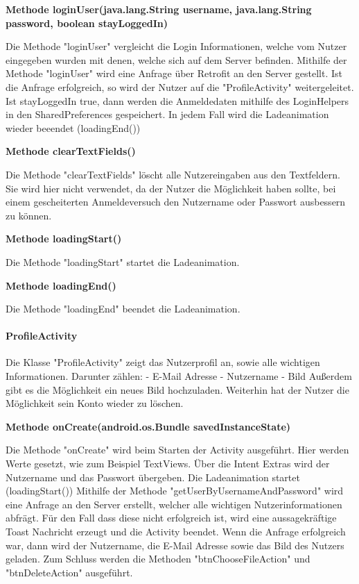 \documentclass{scrartcl}
\begin{document}
\noindent\textbf{Methode loginUser(java.lang.String username, \newline                     java.lang.String password, boolean stayLoggedIn)}

\noindent Die Methode "loginUser" vergleicht die Login Informationen, welche vom Nutzer eingegeben wurden mit denen, welche sich auf dem Server befinden. Mithilfe der Methode "loginUser" wird eine Anfrage über Retrofit an den Server gestellt. Ist die Anfrage erfolgreich, so wird der Nutzer auf die "ProfileActivity" weitergeleitet. Ist stayLoggedIn true, dann werden die Anmeldedaten mithilfe des LoginHelpers in den SharedPreferences gespeichert. In jedem Fall wird die Ladeanimation wieder beeendet (loadingEnd()) \newline

\noindent\textbf{Methode clearTextFields()}

\noindent Die Methode "clearTextFields" löscht alle Nutzereingaben aus den Textfeldern. Sie wird hier nicht verwendet, da der Nutzer die Möglichkeit haben sollte, bei einem gescheiterten Anmeldeversuch den Nutzername oder Passwort ausbessern zu können. \newline 

\noindent\textbf{Methode loadingStart()}

\noindent Die Methode "loadingStart" startet die Ladeanimation. \newline

\noindent\textbf{Methode loadingEnd()}

\noindent Die Methode "loadingEnd" beendet die Ladeanimation. \newline

\newpage

\paragraph{ProfileActivity}
Die Klasse "ProfileActivity" zeigt das Nutzerprofil an, sowie alle wichtigen Informationen. Darunter zählen: - E-Mail Adresse - Nutzername - Bild Außerdem gibt es die Möglichkeit ein neues Bild hochzuladen. Weiterhin hat der Nutzer die Möglichkeit sein Konto wieder zu löschen. \newline 

\noindent\textbf{Methode onCreate(android.os.Bundle savedInstanceState)}

\noindent Die Methode "onCreate" wird beim Starten der Activity ausgeführt. Hier werden Werte gesetzt, wie zum Beispiel TextViews. Über die Intent Extras wird der Nutzername und das Passwort übergeben. Die Ladeanimation startet (loadingStart()) Mithilfe der Methode "getUserByUsernameAndPassword" wird eine Anfrage an den Server erstellt, welcher alle wichtigen Nutzerinformationen abfrägt. Für den Fall dass diese nicht erfolgreich ist, wird eine aussagekräftige Toast Nachricht erzeugt und die Activity beendet. Wenn die Anfrage erfolgreich war, dann wird der Nutzername, die E-Mail Adresse sowie das Bild des Nutzers geladen. Zum Schluss werden die Methoden "btnChooseFileAction" und "btnDeleteAction" ausgeführt. \newline 
\end{document}
